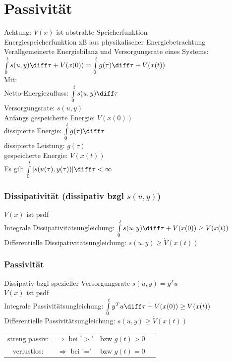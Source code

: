 \documentclass[german]{latex4ei/latex4ei_sheet}
\begin{document}
\section{Passivität}
\begin{sectionbox}
Achtung: $V(x)$ ist abstrakte Speicherfunktion \\
Energiespeicherfunktion zB aus physikalischer Energiebetrachtung\\

Verallgemeinerte Energiebilanz und Versorgungsrate eines Systems:\\
$\int\limits_{0}^{t} s(u,y) \diff \tau + V(x(0)) = \int\limits_{0}^{t} g(\tau) \diff \tau + V(x(t))$  \\
Mit: \\
Netto-Energiezufluss: $\int\limits_{0}^{t} s(u,y) \diff \tau$ \\
Versorgungsrate: $s(u,y)$ \\
Anfangs gespeicherte Energie: $V(x(0))$ \\
dissipierte Energie: $\int\limits_{0}^{t} g(\tau) \diff \tau$ \\
dissipierte Leistung: $g(\tau)$ \\
gespeicherte Energie: $V(x(t))$ \\
Es gilt $\int\limits_{0}^{t}|s(u(\tau), y(\tau))| \diff \tau < \infty$

\subsubsection{Dissipativität (dissipativ bzgl $s(u,y)$)}
$V(x)$ ist psdf \\
Integrale Dissipativitätsungleichung: $\int\limits_{0}^{t} s(u,y) \diff \tau + V(x(0)) \geq V(x(t))$ \\
Differentielle Dissipativitätsungleichung: $s(u,y) \geq \dot{V}(x(t))$

\subsubsection{Passivität}
Dissipativ bzgl spezieller Versorgungsrate $s(u,y) = y^T u$ \\
$V(x)$ ist psdf \\
Integrale Passivitätsungleichung: $\int\limits_{0}^{t} y^T u \diff \tau + V(x(0)) \geq V(x(t))$ \\
Differentielle Passivitätsungleichung: $s(u,y) \geq \dot{V}(x(t))$ \\
\begin{tabular}{cccc}
  streng passiv: &  $\Rightarrow$ bei '$>$' & bzw $g(t) > 0$ \\
  verlustlos:    &  $\Rightarrow$ bei '=' & bzw $g(t) = 0$
\end{tabular}
\end{sectionbox}
\end{document}
